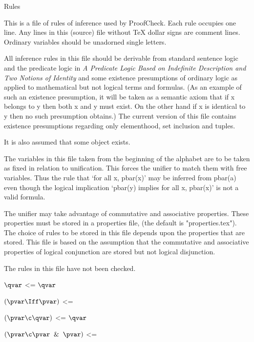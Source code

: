 

\lineb
\vskip 1in 

\centerline{\bigrm Rules }
\vskip 1in 
{\bigrm

		This is a file of rules of inference used by ProofCheck.
Each rule occupies one line.  Any lines in this 
(source) file without {\TeX} dollar
signs are comment lines.  Ordinary variables
should be unadorned single letters.  

 } 

All inference rules in this file should be
derivable from standard sentence logic and 
the predicate logic in {\it A Predicate Logic Based on 
Indefinite Description and Two Notions of Identity} 
and some existence presumptions of ordinary logic
as applied to mathematical but not logical terms
and formulas.  (As an example of such an existence
presumption, it will be taken as a semantic axiom
that if x belongs to y then both x and y must exist.
On the other hand if x is identical to y then no
such presumption obtains.)
The current version of this file contains existence presumptions
regarding only elementhood, set inclusion  and tuples.

It is also assumed that some object exists. 

The variables in this file taken from the beginning of the alphabet
are to be taken as fixed in relation to unification.  This forces the
unifier to match them with free variables.
Thus the rule that `for all x, pbar(x)' may be inferred from pbar(a)
even though the logical implication `pbar(y) implies for all x, pbar(x)'
is not a valid formula.   

The unifier may take advantage of commutative and associative properties.
These properties must be stored in a properties file, (the default is
"properties.tex").   The choice of rules to be stored in this file
depends upon the properties that are stored.  This file is based on
the assumption that the commutative and associative properties of
logical conjunction are stored but not logical disjunction.

The rules in this file have not been checked.   
\lineb



$\qvar$ <= $\qvar$ 

$(\pvar \Iff \pvar)$ <=

$(\pvar \c \qvar)$ <= $\qvar$

$(\pvar \c \pvar \And \pvar )$ <= 

